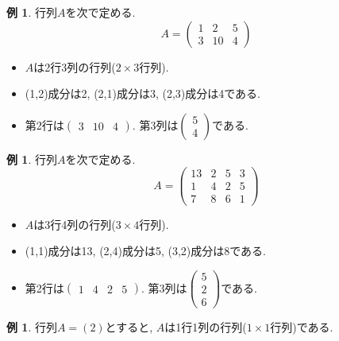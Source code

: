 \documentclass[dvipdfmx,a4paper,11pt]{article}
\theoremstyle{definition}
\newtheorem{exa}[thm]{例}
\begin{document}
 \begin{exa}
 行列$A$を次で定める.
 $$
 A = 
 \begin{pmatrix}
 1 &2&5 \\
 3&10&4
 \end{pmatrix}
 $$
 \begin{itemize}
   \setlength{\parskip}{0cm} 
  \setlength{\itemsep}{0cm}
 \item $A$は2行3列の行列($2 \times 3$行列).
 \item (1,2)成分は2, (2,1)成分は3, (2,3)成分は4である.
 \item 第2行は$\begin{pmatrix}3 & 10 & 4\end{pmatrix}$. 第3列は$\begin{pmatrix}5 \\ 4\end{pmatrix}$である.
 \end{itemize}
 \end{exa}
  \begin{exa}
 行列$A$を次で定める.
 $$
 A = 
 \begin{pmatrix}
 13 &2&5&3 \\
 1 &4&2&5 \\
  7&8&6&1 
 \end{pmatrix}
 $$
 \begin{itemize}
   \setlength{\parskip}{0cm} 
  \setlength{\itemsep}{0cm}
 \item $A$は3行4列の行列($3 \times 4$行列).
 \item (1,1)成分は13, (2,4)成分は5, (3,2)成分は8である.
 \item 第2行は$\begin{pmatrix}1&4&2&5\end{pmatrix}$. 第3列は$\begin{pmatrix}5 \\2\\ 6\end{pmatrix}$である.
 \end{itemize}
 \end{exa}
 
 \begin{exa}行列$A = (2)$とすると, $A$は1行1列の行列($1 \times 1$行列)である.\end{exa}
  
\end{document}
